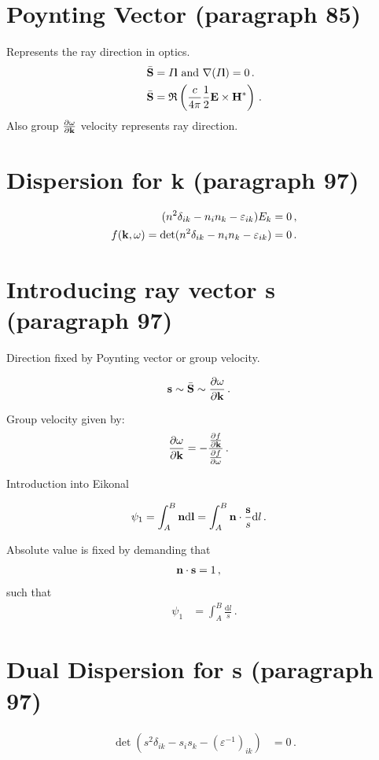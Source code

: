 \documentclass[a4paper,12pt]{article}
\newcommand{\vct}[1]{{\bf #1}}
\begin{document}
\section{Poynting Vector (paragraph 85)}
Represents the ray direction in optics.
\begin{align}
 \bar{\vct{S}} &= I \vct{l}\text{ and }\vct{\nabla}(I \vct{l}) = 0\,.\\
 \bar{\vct{S}} &= \mathfrak{R} 
 \left(
 \frac{c}{4\pi} \frac{1}{2} 
 \vct{E} \times \vct{H}^\ast
 \right)\,.
\end{align}
Also group $\tfrac{\partial \omega}{\partial \vct{k}}$ 
velocity represents ray direction.

\section{Dispersion for k (paragraph 97)}

\begin{align}
 (n^2 \delta_{ik} - n_i n_k - \varepsilon_{ik}) E_k &= 0\,,\\
 f(\vct{k}, \omega) = \det(n^2 \delta_{ik} - n_i n_k - \varepsilon_{ik}) &= 0\,.
\end{align}

\section{Introducing ray vector s (paragraph 97)}

Direction fixed by Poynting vector or group velocity.

\begin{align}
 \vct{s} &\sim \bar{\vct{S}} \sim \frac{\partial \omega}{\partial \vct{k}}\,.
\end{align}

Group velocity given by:
\begin{align}
 \frac{\partial \omega}{\partial \vct{k}} &= - 
 \frac{\frac{\partial f}{\partial \vct{k}}}
 {\frac{\partial f}{\partial \omega}}\,.
\end{align}


Introduction into Eikonal

\begin{align}
 \psi_1 &= \int_A^B \vct{n} \text{d}\vct{l}
 = \int_A^B \vct{n}\cdot\frac{\vct{s}}{s} \text{d}l\,.
\end{align}

Absolute value is fixed by demanding that
\begin{align}
 \vct{n}\cdot\vct{s} &= 1\,,
\end{align}
such that
\begin{align}
 \psi_1 &= \int_A^B \frac{\text{d}l}{s}\,.
\end{align}

\section{Dual Dispersion for s (paragraph 97)}

\begin{align}
 \det(s^2 \delta_{ik} - s_i s_k - (\varepsilon^{-1})_{ik}) &= 0\,.
\end{align}
\end{document}
